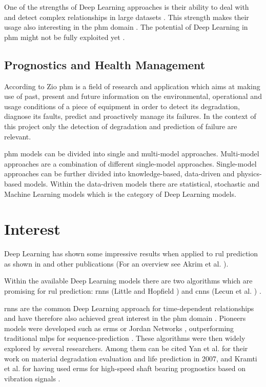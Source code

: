 \documentclass[conference]{IEEEtran}
\begin{document}
One of the strengths of Deep Learning approaches is their ability to deal with and detect complex relationships in large datasets \cite{MONTEROJIMENEZ2020539}. This strength makes their usage also interesting in the \gls{phm} domain \cite{Wu2015}. The potential of Deep Learning in \gls{phm} might not be fully exploited yet \cite{Akrim2021}.

\noindent
\subsection{Prognostics and Health Management}

According to Zio \cite{Zio2012} \gls{phm} is a field of research and application which aims at making use of past, present and future information on the environmental, operational and usage conditions of a piece of equipment in order to detect its degradation, diagnose its faults, predict and proactively manage its failures. In the context of this project only the detection of degradation and prediction of failure are relevant.

\gls{phm} models can be divided into single and multi-model approaches. Multi-model approaches are a combination of different single-model approaches. Single-model approaches can be further divided into knowledge-based, data-driven and physics-based models. Within the data-driven models there are statistical, stochastic and Machine Learning models which is the category of Deep Learning models. \cite{MONTEROJIMENEZ2020539}

\section{Interest}
\label{sec:interest}

Deep Learning has shown some impressive results when applied to \gls{rul} prediction as shown in \cite{Xu2018, Li2018, Liu2019, Yuan2016, Wu2018, Park2020} and other publications (For an overview see Akrim et al. \cite{Akrim2021}).

Within the available Deep Learning models there are two algorithms which are promising for \gls{rul} prediction: \glspl{rnn} (Little \cite{Little1996} and Hopfield  \cite{Hopfield1982}) and \glspl{cnn} (Lecun et al. \cite{Lecun1998}) \cite{Akrim2021}.

\glspl{rnn} are the common Deep Learning approach for time-dependent relationships and have therefore also achieved great interest in the \gls{phm} domain \cite{Akrim2021}. Pioneers models were developed such as \glspl{erm} \cite{Elman1990} or Jordan Networks \cite{Jordan1997}, outperforming traditional \glspl{mlp} for sequence-prediction \cite{Akrim2021}. These algorithms were then widely explored by several researchers. Among them can be cited Yan et al. \cite{Yan2007} for their work on material degradation evaluation and life prediction in 2007, and Kramti et al. \cite{Kramti2018} for having used \glspl{erm} for high-speed shaft bearing prognostics based on vibration signals \cite{Akrim2021}.
\end{document}
